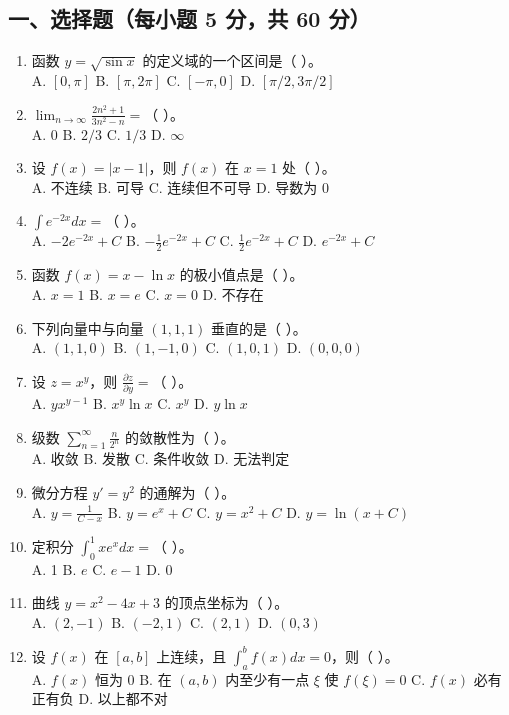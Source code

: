 \documentclass[11pt,a4paper]{article}
\begin{document}
\subsection*{一、选择题（每小题 5 分，共 60 分）}
\begin{enumerate}
    \item 函数 $y = \sqrt{\sin x}$ 的定义域的一个区间是（ ）。 \\
    A. $[0, \pi]$ \quad B. $[\pi, 2\pi]$ \quad C. $[-\pi, 0]$ \quad D. $[\pi/2, 3\pi/2]$
    \item $\lim_{n \to \infty} \frac{2n^2 + 1}{3n^2 - n} = $（ ）。 \\
    A. 0 \quad B. $2/3$ \quad C. $1/3$ \quad D. $\infty$
    \item 设 $f(x) = |x-1|$，则 $f(x)$ 在 $x=1$ 处（ ）。 \\
    A. 不连续 \quad B. 可导 \quad C. 连续但不可导 \quad D. 导数为 0
    \item $\int e^{-2x} dx = $（ ）。 \\
    A. $-2e^{-2x} + C$ \quad B. $-\frac{1}{2}e^{-2x} + C$ \quad C. $\frac{1}{2}e^{-2x} + C$ \quad D. $e^{-2x} + C$
    \item 函数 $f(x) = x - \ln x$ 的极小值点是（ ）。 \\
    A. $x=1$ \quad B. $x=e$ \quad C. $x=0$ \quad D. 不存在
    \item 下列向量中与向量 $(1, 1, 1)$ 垂直的是（ ）。 \\
    A. $(1, 1, 0)$ \quad B. $(1, -1, 0)$ \quad C. $(1, 0, 1)$ \quad D. $(0, 0, 0)$
    \item 设 $z = x^y$，则 $\frac{\partial z}{\partial y} = $（ ）。 \\
    A. $yx^{y-1}$ \quad B. $x^y \ln x$ \quad C. $x^y$ \quad D. $y \ln x$
    \item 级数 $\sum_{n=1}^{\infty} \frac{n}{2^n}$ 的敛散性为（ ）。 \\
    A. 收敛 \quad B. 发散 \quad C. 条件收敛 \quad D. 无法判定
    \item 微分方程 $y' = y^2$ 的通解为（ ）。 \\
    A. $y = \frac{1}{C-x}$ \quad B. $y = e^x + C$ \quad C. $y = x^2 + C$ \quad D. $y = \ln(x+C)$
    \item 定积分 $\int_0^1 x e^x dx = $（ ）。 \\
    A. 1 \quad B. $e$ \quad C. $e-1$ \quad D. 0
    \item 曲线 $y = x^2 - 4x + 3$ 的顶点坐标为（ ）。 \\
    A. $(2, -1)$ \quad B. $(-2, 1)$ \quad C. $(2, 1)$ \quad D. $(0, 3)$
    \item 设 $f(x)$ 在 $[a, b]$ 上连续，且 $\int_a^b f(x) dx = 0$，则（ ）。 \\
    A. $f(x)$ 恒为 0 \quad B. 在 $(a, b)$ 内至少有一点 $\xi$ 使 $f(\xi)=0$ \quad C. $f(x)$ 必有正有负 \quad D. 以上都不对
\end{enumerate}
\end{document}

